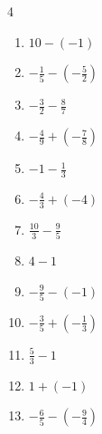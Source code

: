 \begin{multicols}{4}
\begin{enumerate}

  \item $\displaystyle 10 - \left(-1\right)$

        \phantom{$\displaystyle =11$}

  \item $\displaystyle -\frac{1}{5} - \left(-\frac{5}{2}\right)$


  \item $\displaystyle -\frac{3}{2} - \frac{8}{7}$


\columnbreak %

  \item $\displaystyle -\frac{4}{9} + \left(-\frac{7}{8}\right)$


  \item $\displaystyle -1 - \frac{1}{3}$


  \item $\displaystyle -\frac{4}{3} + \left(-4\right)$


  \item $\displaystyle \frac{10}{3} - \frac{9}{5}$


  \item $\displaystyle 4 - 1$

        \phantom{$\displaystyle =3$}

  \item $\displaystyle -\frac{9}{5} - \left(-1\right)$


  \item $\displaystyle -\frac{3}{5} + \left(-\frac{1}{3}\right)$


  \item $\displaystyle \frac{5}{3} - 1$


  \item $\displaystyle 1 + \left(-1\right)$

        \phantom{$\displaystyle =0$}

  \item $\displaystyle -\frac{6}{5} - \left(-\frac{9}{4}\right)$


\end{enumerate}
\end{multicols}

